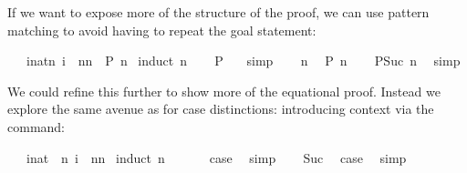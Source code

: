 \begin{isabellebody}
\begin{isamarkuptext}
If we want to expose more of the structure of the
proof, we can use pattern matching to avoid having to repeat the goal
statement:%
\end{isamarkuptext}%
\isamarkuptrue%
\ {\isachardoublequote}{}\ {\isacharasterisk}\ {\isacharparenleft}{\isasymSum}i{\isacharcolon}{\isacharcolon}nat{\isasymle}n{\isachardot}\ i{\isacharparenright}\ {\isacharequal}\ n{\isacharasterisk}{\isacharparenleft}n{\isacharplus}{}{\isacharparenright}{\isachardoublequote}\ {\isacharparenleft}\ {\isachardoublequote}{\isacharquery}P\ n{\isachardoublequote}{\isacharparenright}\isanewline
\isamarkupfalse%
\ {\isacharparenleft}induct\ n{\isacharparenright}\isanewline
\ \ \isamarkupfalse%
\ {\isachardoublequote}{\isacharquery}P\ {}{\isachardoublequote}\ \isamarkupfalse%
\ simp\isanewline
\isamarkupfalse%
\isanewline
\ \ \isamarkupfalse%
\ n\ \isamarkupfalse%
\ {\isachardoublequote}{\isacharquery}P\ n{\isachardoublequote}\isanewline
\ \ \isamarkupfalse%
\ {\isachardoublequote}{\isacharquery}P{\isacharparenleft}Suc\ n{\isacharparenright}{\isachardoublequote}\ \isamarkupfalse%
\ simp\isanewline
\isamarkupfalse%
\isamarkupfalse%
%
\begin{isamarkuptext}%
\noindent We could refine this further to show more of the equational
proof. Instead we explore the same avenue as for case distinctions:
introducing context via the  command:%
\end{isamarkuptext}%
\isamarkuptrue%
\ {\isachardoublequote}{}\ {\isacharasterisk}\ {\isacharparenleft}{\isasymSum}i{\isacharcolon}{\isacharcolon}nat\ {\isasymle}\ n{\isachardot}\ i{\isacharparenright}\ {\isacharequal}\ n{\isacharasterisk}{\isacharparenleft}n{\isacharplus}{}{\isacharparenright}{\isachardoublequote}\isanewline
\isamarkupfalse%
\ {\isacharparenleft}induct\ n{\isacharparenright}\isanewline
\ \ \isamarkupfalse%
\ {}\ \isamarkupfalse%
\ {\isacharquery}case\ \isamarkupfalse%
\ simp\isanewline
\isamarkupfalse%
\isanewline
\ \ \isamarkupfalse%
\ Suc\ \isamarkupfalse%
\ {\isacharquery}case\ \isamarkupfalse%
\ simp\isanewline
\isamarkupfalse%
\isamarkupfalse%
%
\begin{isamarkuptext}%

\end{isamarkuptext}
\end{isabellebody}
